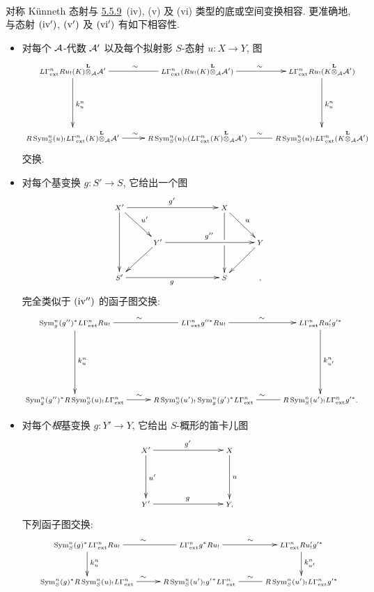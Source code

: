 \paragraph{}
对称 Künneth 态射与 \hyperref[XVII.subsubsec5.5.9]{5.5.9}~(iv), (v) 及 (vi) 类型的底或空间变换相容. 更准确地, 与态射  ${\rm(iv')}$, ${\rm(v')}$ 及 ${\rm(vi')}$ 有如下相容性.
\begin{itemize}
\item[${\rm(iv'')}$] 对每个 ${\mathcal A}$-代数 ${\mathcal A}'$ 以及每个拟射影 $S$-态射 $u:X\rightarrow Y$, 图
\[\def\objectstyle{\scriptstyle}
\xymatrix@C=.8cm@R=1.75cm{
L\Gamma^n_{\ext}Ru_{!}(K)\overset{\LL}{\otimes}_{\Aa}\Aa'
\ar@{-}[r]^{\sim} \ar[d]^{k^n_u}&
L\Gamma^n_{\ext}(Ru_{!}(K)\overset{\LL}{\otimes}_{\Aa}\Aa')
\ar@{->}[r]^{\sim}&
L\Gamma^n_{\ext}Ru_{!}(K\overset{\LL}{\otimes}_{\Aa}\Aa') \ar[d]^{k^n_u}\\
R\Sym^n_S(u)_{!}L\Gamma^n_{\ext}(K)\overset{\LL}{\otimes}_{\Aa}\Aa'
\ar@{->}[r]^{\sim}&
R\Sym^n_S(u)_{!}(L\Gamma^n_{\ext}(K)\overset{\LL}{\otimes}_{\Aa}\Aa')
\ar@{-}[r]^{\sim}&
R\Sym^n_S(u)_{!}L\Gamma^n_{\ext}(K\overset{\LL}{\otimes}_{\Aa}\Aa')
}
\]
交换.

\item[${\rm(v'')}$] 对\pageoriginale 每个基变换 $g:S'\rightarrow S$, 它给出一个图
$$
\xymatrix{
X' \ar[rrr]^{g'}\ar[rd]^{u'}\ar[dd]&   & & X \ar[rd]^{u}\ar[dd]|\hole &   \\
   & Y' \ar[ld]\ar[rrr]^{g''}&  & & Y \ar[ld]\\
S' \ar[rrr]_{g}&  &  & S &   ,
}
$$
完全类似于 ${\rm(iv'')}$ 的函子图交换:
$$\def\objectstyle{\scriptstyle}
\xymatrix@R=2.25cm{
\Sym^n_g(g'')^{\ast}L\Gamma^n_{\ext}Ru_{!} \ar@{-}[r]^{\sim} \ar[d]^{k^n_u}&
L\Gamma^n_{\ext}g''^{\ast}Ru_{!} \ar[r]^{\sim}& L\Gamma^n_{\ext}Ru'_{!}
g'^{\ast}\ar[d]^{k^n_{u'}} \\
\Sym^n_g(g'')^{\ast}R\Sym^n_S(u)_{!}L\Gamma^n_{\ext} \ar[r]^{\sim}& R
\Sym^n_S(u')_{!}\Sym^n_g(g')^{\ast}L\Gamma^n_{\ext} \ar@{-}[r]^\sim& R\Sym^n_S(u')_{!}L\Gamma^n_{\ext}g'^{\ast}.
}
$$

\item[${\rm(vi'')}$] 对每个\emph{根}基变换 $g:Y'\rightarrow Y$, 它给出 $S$-概形的笛卡儿图
$$
\xymatrix@C=2.5cm@R=1.5cm{
X' \ar[r]^{g'}\ar[d]^{u'}& X \ar[d]^{u}\\
Y' \ar[r]^{g}& Y,
}
$$
下列函子图交换:
\[
\xymatrix{
\Sym^n_S(g)^{\ast}L\Gamma^n_{\ext}Ru_{!} \ar@{-}[r]^{\sim} \ar[d]^{k^n_u}&
L\Gamma^n_{\ext}g^{\ast}Ru_{!} \ar[r]^{\sim}& L\Gamma^n_{\ext}
Ru'_{!}g'^{\ast} \ar[d]^{k^n_{u'}}\\
\Sym^n_S(g)^{\ast}R\Sym^n_S(u\sisi{_!)}{)_!L\Gamma^n_{\ext}} \ar[r]^{\sim}& R
\Sym^n_S(u')_{!}{g'}^{\ast}L\Gamma^n_{\ext} \ar@{-}[r]^{\sim}& R\Sym^n_S(u')_{!}L\Gamma^n_{\ext}g'^{\ast}
}
\]
\end{itemize}

